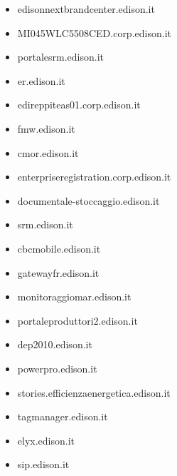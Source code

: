 \documentclass{article}
\begin{document}
\begin{itemize}
            \item edisonnextbrandcenter.edison.it
        
            \item MI045WLC5508CED.corp.edison.it
        
            \item portalesrm.edison.it
        
            \item er.edison.it
        
            \item edireppiteas01.corp.edison.it
        
            \item fmw.edison.it
        
            \item cmor.edison.it
        
            \item enterpriseregistration.corp.edison.it
        
            \item documentale-stoccaggio.edison.it
        
            \item srm.edison.it
        
            \item cbcmobile.edison.it
        
            \item gatewayfr.edison.it
        
            \item monitoraggiomar.edison.it
        
            \item portaleproduttori2.edison.it
        
            \item dep2010.edison.it
        
            \item powerpro.edison.it
        
            \item stories.efficienzaenergetica.edison.it
        
            \item tagmanager.edison.it
        
            \item elyx.edison.it
        
            \item sip.edison.it
        

\end{itemize}
\end{document}
